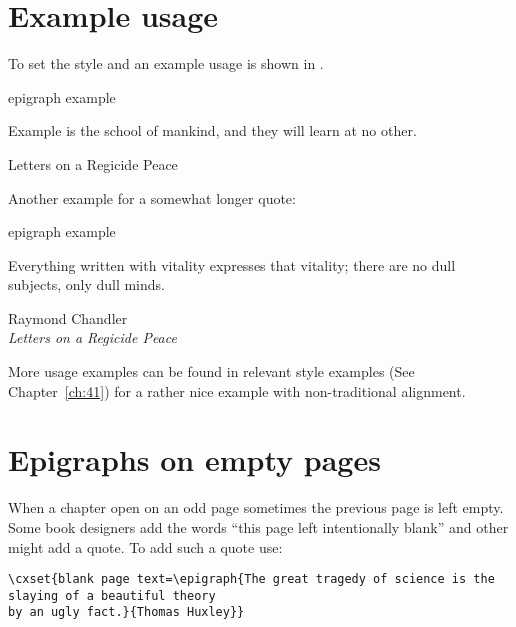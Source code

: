 \section{Example usage}
To set the style and an example usage is shown in .

\begin{example}{epigraph example}{}

\epigraph{Example is the school of mankind, and they
will learn at no other.}{Letters on a Regicide Peace}
\end{example}

Another example for a somewhat longer quote:

\begin{example}{epigraph example}{}
\epigraph{Everything written with vitality expresses that vitality; there are no dull subjects, only dull minds.}{Raymond Chandler\\\textit{Letters on a Regicide Peace}}
\end{example}

More usage examples can be found in relevant style examples (See Chapter~\ref{ch:41}) for a rather nice example with non-traditional alignment.

\section{Epigraphs on empty pages}

When a chapter open on an odd page sometimes the  previous page is left empty. Some book designers add the words ``this page left intentionally blank'' and other might add a quote. To add such a quote use:

\begin{tcolorbox}
\begin{lstlisting}
\cxset{blank page text=\epigraph{The great tragedy of science is the slaying of a beautiful theory
by an ugly fact.}{Thomas Huxley}}
\end{lstlisting}
\end{tcolorbox}
